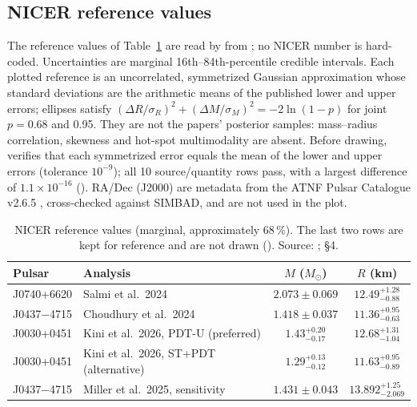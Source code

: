 \documentclass[11pt,a4paper]{article}
\newcommand{\Msun}{M_\odot}
\newcommand{\ee}[2]{#1\times10^{#2}}
\begin{document}
\subsection{NICER reference values}
The reference values of Table~\ref{tab:nicer} are read by  from
; no NICER number is hard-coded. Uncertainties are marginal
16th--84th-percentile credible intervals. Each plotted reference is an uncorrelated, symmetrized Gaussian
approximation whose standard deviations are the arithmetic means of the published lower and upper errors;
ellipses satisfy $(\Delta R/\sigma_R)^2+(\Delta M/\sigma_M)^2=-2\ln(1-p)$ for joint $p=0.68$ and 0.95.
They are not the papers' posterior samples: mass--radius correlation, skewness and hot-spot multimodality
are absent. Before drawing,  verifies that each symmetrized error equals
the mean of the lower and upper errors (tolerance $10^{-9}$); all 10 source/quantity rows pass, with a largest
difference of $\ee{1.1}{-16}$ (). RA/Dec (J2000) are metadata from the ATNF
Pulsar Catalogue v2.6.5 \cite{atnf}, cross-checked against SIMBAD, and are not used in the plot.

\begin{table}[t]
\centering
\caption[]{NICER reference values (marginal, approximately 68\,\%). The last two rows are kept for reference
and are not drawn (). Source: ;  \S4.}
\label{tab:nicer}
\begin{tabular}{llcc}
\toprule
Pulsar & Analysis & $M$ ($\Msun$) & $R$ (km)\\
\midrule
J0740+6620 & Salmi et al.\ 2024 \cite{salmi} & $2.073\pm0.069$ & $12.49^{+1.28}_{-0.88}$\\
J0437$-$4715 & Choudhury et al.\ 2024 \cite{choudhury} & $1.418\pm0.037$ & $11.36^{+0.95}_{-0.63}$\\
J0030+0451 & Kini et al.\ 2026, PDT-U (preferred) \cite{kini} & $1.43^{+0.20}_{-0.17}$ & $12.68^{+1.31}_{-1.04}$\\
\midrule
J0030+0451 & Kini et al.\ 2026, ST+PDT (alternative) \cite{kini} & $1.29^{+0.13}_{-0.12}$ & $11.63^{+0.95}_{-0.89}$\\
J0437$-$4715 & Miller et al.\ 2025, sensitivity \cite{miller} & $1.431\pm0.043$ & $13.892^{+1.25}_{-2.069}$\\
\bottomrule
\end{tabular}
\end{table}
\end{document}
